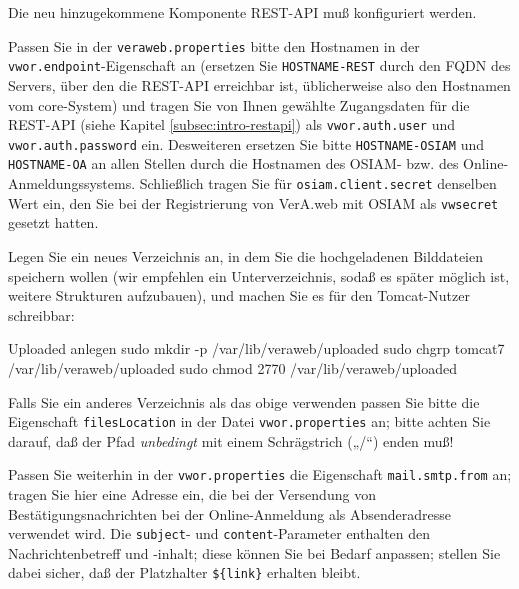 Die neu hinzugekommene Komponente REST-API muß konfiguriert werden.

Passen Sie in der \texttt{veraweb.properties} bitte den Hostnamen
in der \texttt{vwor.endpoint}-Eigenschaft an (ersetzen Sie
\texttt{HOSTNAME-REST} durch den FQDN des Servers, über den die
REST-API erreichbar ist, üblicherweise also den Hostnamen vom
core-System) und tragen Sie von Ihnen gewählte Zugangsdaten für
die REST-API (siehe Kapitel \ref{subsec:intro-restapi}) als
\texttt{vwor.auth.user} und \texttt{vwor.auth.password} ein.
\ifoa
Desweiteren ersetzen Sie bitte \texttt{HOSTNAME-OSIAM} und
\texttt{HOSTNAME-OA} an allen Stellen durch die Hostnamen
des OSIAM- bzw. des Online-Anmeldungssystems. Schließlich
tragen Sie für \texttt{osiam.client.secret} denselben Wert
ein, den Sie bei der
 \ifupgradeanleitung
  Registrierung von VerA.web mit OSIAM
 \else%
 \fi%
als \texttt{vwsecret} gesetzt hatten.
\fi%

\begin{minipage}{\textwidth}
Legen Sie ein neues Verzeichnis an, in dem Sie die hochgeladenen
Bilddateien speichern wollen (wir empfehlen ein Unterverzeichnis,
sodaß es später möglich ist, weitere Strukturen aufzubauen), und
machen Sie es für den Tomcat-Nutzer schreibbar:

\begin{lstdump}{Uploaded anlegen}
sudo mkdir -p /var/lib/veraweb/uploaded
sudo chgrp tomcat7 /var/lib/veraweb/uploaded
sudo chmod 2770 /var/lib/veraweb/uploaded
\end{lstdump}

Falls Sie ein anderes Verzeichnis als das obige verwenden passen
Sie bitte die Eigenschaft \texttt{filesLocation} in der Datei
\texttt{vwor.properties} an; bitte achten Sie darauf, daß der
Pfad \emph{unbedingt} mit einem Schrägstrich („/“) enden muß!
\end{minipage}

\ifoa

Passen Sie weiterhin in der \texttt{vwor.properties} die Eigenschaft
\texttt{mail.smtp.from} an; tragen Sie hier eine Adresse ein, die bei
der Versendung von Bestätigungsnachrichten bei der Online-Anmeldung
als Absenderadresse verwendet wird. Die \texttt{subject}- und
\texttt{content}-Parameter enthalten den Nachrichtenbetreff und
-inhalt; diese können Sie bei Bedarf anpassen; stellen Sie dabei
sicher, daß der Platzhalter \texttt{\$\{link\}} erhalten bleibt.

\fi%

